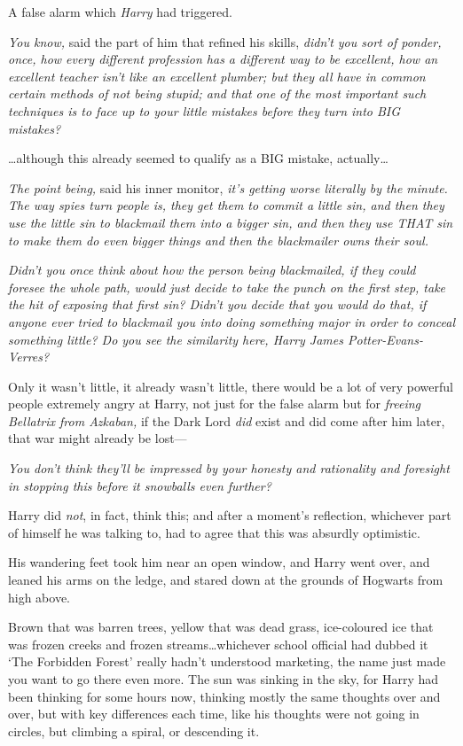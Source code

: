 A false alarm which \emph{Harry} had triggered.

\emph{You know,} said the part of him that refined his skills, \emph{didn't you
sort of ponder, once, how every different profession has a different way to be
excellent, how an excellent teacher isn't like an excellent plumber; but they
all have in common certain methods of not being stupid; and that one of the
most important such techniques is to face up to your little mistakes before
they turn into BIG mistakes?}

…although this already seemed to qualify as a BIG mistake,
actually…

\emph{The point being,} said his inner monitor, \emph{it's getting worse
literally by the minute. The way spies turn people is, they get them to commit
a little sin, and then they use the little sin to blackmail them into a bigger
sin, and then they use THAT sin to make them do even bigger things and then the
blackmailer owns their soul.}

\emph{Didn't you once think about how the person being blackmailed, if they
could foresee the whole path, would just decide to take the punch on the first
step, take the hit of exposing that first sin? Didn't you decide that you would
do that, if anyone ever tried to blackmail you into doing something major in
order to conceal something little? Do you see the similarity here, Harry James
Potter-Evans-Verres?}

Only it wasn't little, it already wasn't little, there would be a lot of very
powerful people extremely angry at Harry, not just for the false alarm but for
\emph{freeing Bellatrix from Azkaban,} if the Dark Lord \emph{did} exist and
did come after him later, that war might already be lost—

\emph{You don't think they'll be impressed by your honesty and rationality and
foresight in stopping this before it snowballs even further?}

Harry did \emph{not}, in fact, think this; and after a moment's reflection,
whichever part of himself he was talking to, had to agree that this was
absurdly optimistic.

His wandering feet took him near an open window, and Harry went over, and
leaned his arms on the ledge, and stared down at the grounds of Hogwarts from
high above.

Brown that was barren trees, yellow that was dead grass, ice-coloured ice that
was frozen creeks and frozen streams…whichever school official had
dubbed it `The Forbidden Forest' really hadn't understood marketing, the name
just made you want to go there even more. The sun was sinking in the sky, for
Harry had been thinking for some hours now, thinking mostly the same thoughts
over and over, but with key differences each time, like his thoughts were not
going in circles, but climbing a spiral, or descending it.

